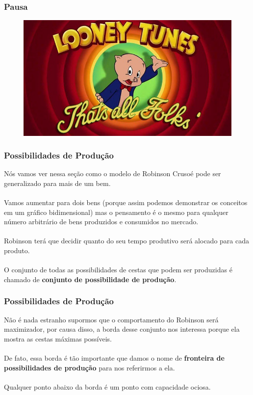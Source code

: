 \documentclass{beamer}[10]
\begin{document}
\begin{frame}
	\frametitle{Pausa}

	\begin{figure}[H]
		\centering
		\colorbox{white}{\includegraphics[scale=0.425]{pausa.png}}
	\end{figure}		

\end{frame}

\begin{frame}
	\frametitle{Possibilidades de Produção}

	Nós vamos ver nessa seção como o modelo de Robinson Crusoé pode ser generalizado para mais de um bem.
	\\~\\
	Vamos aumentar para dois bens (porque assim podemos demonstrar os conceitos em um gráfico bidimensional) mas o pensamento é o mesmo para qualquer número arbitrário de bens produzidos e consumidos no mercado.
	\\~\\
	Robinson terá que decidir quanto do seu tempo produtivo será alocado para cada produto.
	\\~\\
	O conjunto de todas as possibilidades de cestas que podem ser produzidas é chamado de \textbf{conjunto de possibilidade de produção}.

\end{frame}

\begin{frame}
	\frametitle{Possibilidades de Produção}

	Não é nada estranho supormos que o comportamento do Robinson será maximizador, por causa disso, a borda desse conjunto nos interessa porque ela mostra as cestas máximas possíveis.
	\\~\\
	De fato, essa borda é tão importante que damos o nome de \textbf{fronteira de possibilidades de produção} para nos referirmos a ela.
	\\~\\
	Qualquer ponto abaixo da borda é um ponto com capacidade ociosa.

\end{frame}
\end{document}
